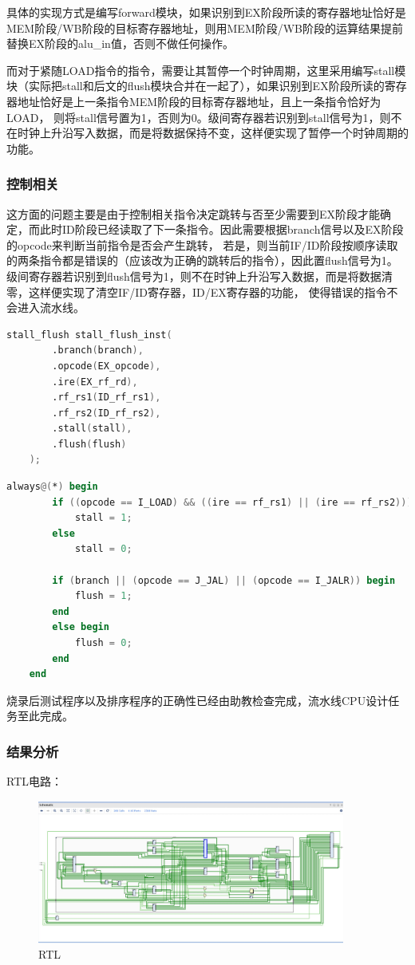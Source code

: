 \documentclass[a4paper]{article}
\begin{document}
具体的实现方式是编写forward模块，如果识别到EX阶段所读的寄存器地址恰好是MEM阶段/WB阶段的目标寄存器地址，则用MEM阶段/WB阶段的运算结果提前替换EX阶段的alu\_in值，否则不做任何操作。

而对于紧随LOAD指令的指令，需要让其暂停一个时钟周期，这里采用编写stall模块（实际把stall和后文的flush模块合并在一起了），如果识别到EX阶段所读的寄存器地址恰好是上一条指令MEM阶段的目标寄存器地址，且上一条指令恰好为LOAD，
则将stall信号置为1，否则为0。级间寄存器若识别到stall信号为1，则不在时钟上升沿写入数据，而是将数据保持不变，这样便实现了暂停一个时钟周期的功能。

\subsubsection{控制相关}
这方面的问题主要是由于控制相关指令决定跳转与否至少需要到EX阶段才能确定，而此时ID阶段已经读取了下一条指令。因此需要根据branch信号以及EX阶段的opcode来判断当前指令是否会产生跳转，
若是，则当前IF/ID阶段按顺序读取的两条指令都是错误的（应该改为正确的跳转后的指令），因此置flush信号为1。级间寄存器若识别到flush信号为1，则不在时钟上升沿写入数据，而是将数据清零，这样便实现了清空IF/ID寄存器，ID/EX寄存器的功能，
使得错误的指令不会进入流水线。
\begin{lstlisting}[language={verilog},title={cpu.v}] 
    stall_flush stall_flush_inst(
        .branch(branch),
        .opcode(EX_opcode),
        .ire(EX_rf_rd),
        .rf_rs1(ID_rf_rs1),
        .rf_rs2(ID_rf_rs2),
        .stall(stall),
        .flush(flush)
    );
\end{lstlisting}


\begin{lstlisting}[language={verilog},title={stall\_flush.v}] 
    always@(*) begin
        if ((opcode == I_LOAD) && ((ire == rf_rs1) || (ire == rf_rs2)))
            stall = 1;
        else
            stall = 0;

        if (branch || (opcode == J_JAL) || (opcode == I_JALR)) begin
            flush = 1;
        end
        else begin
            flush = 0;
        end
    end
\end{lstlisting}


烧录后测试程序以及排序程序的正确性已经由助教检查完成，流水线CPU设计任务至此完成。

\subsubsection{结果分析}
RTL电路：
\begin{figure}[H]
    \centering
    \includegraphics[width=0.9\textwidth]{2.jpg}
    \caption{RTL}
    \label{fig:test1}
\end{figure}
\end{document}

